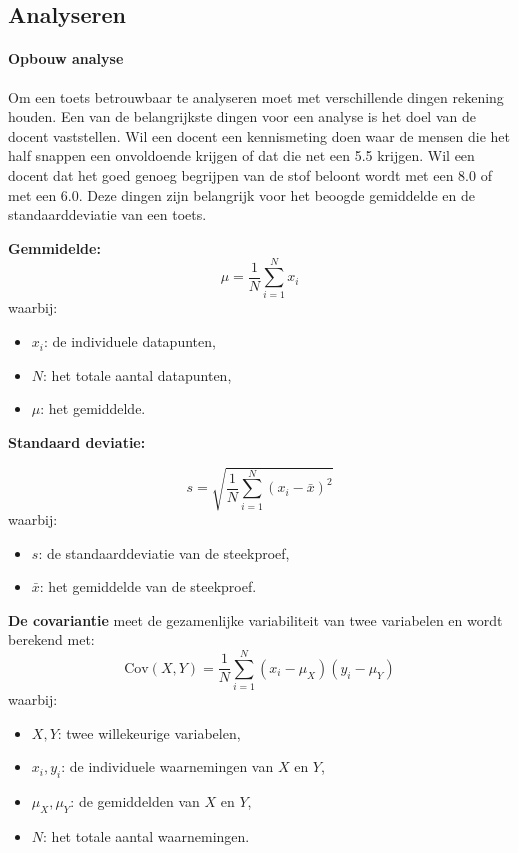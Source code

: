 \documentclass[12pt]{article}
\begin{document}
\subsection{Analyseren}
\begin{multicols}{2}
\paragraph*{Opbouw analyse} Om een toets betrouwbaar te analyseren moet met verschillende dingen rekening houden. Een van de belangrijkste dingen voor een analyse is het doel van de docent vaststellen. Wil een docent een kennismeting doen waar de mensen die het half snappen een onvoldoende krijgen of dat die net een 5.5 krijgen. Wil een docent dat het goed genoeg begrijpen van de stof beloont wordt met een 8.0 of met een 6.0. Deze dingen zijn belangrijk voor het beoogde gemiddelde en de standaarddeviatie van een toets.
\begin{minipage}{1\linewidth}
    
\textbf{Gemmidelde: }
\[
\mu = \frac{1}{N} \sum_{i=1}^N x_i
\]
waarbij:
\begin{itemize}
    \item \( x_i \): de individuele datapunten,
    \item \( N \): het totale aantal datapunten,
    \item \( \mu \): het gemiddelde.
\end{itemize}
\end{minipage}
\begin{minipage}{\linewidth}
\textbf{Standaard deviatie: }

\[
s = \sqrt{\frac{1}{N} \sum_{i=1}^N (x_i - \bar{x})^2}
\]
waarbij:
\begin{itemize}
    \item \( s \): de standaarddeviatie van de steekproef,
    \item \( \bar{x} \): het gemiddelde van de steekproef.
\end{itemize}
\end{minipage}
\begin{minipage}{\linewidth}
\textbf{De covariantie} meet de gezamenlijke variabiliteit van twee variabelen en wordt berekend met:
\[
\text{Cov}(X, Y) = \frac{1}{N} \sum_{i=1}^N (x_i - \mu_X)(y_i - \mu_Y)
\]
waarbij:
\begin{itemize}
    \item \(X, Y\): twee willekeurige variabelen,
    \item \(x_i, y_i\): de individuele waarnemingen van \(X\) en \(Y\),
    \item \(\mu_X, \mu_Y\): de gemiddelden van \(X\) en \(Y\),
    \item \(N\): het totale aantal waarnemingen.
\end{itemize}
\end{minipage}
\end{multicols}
\end{document}

